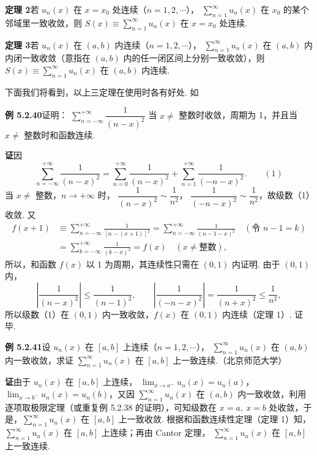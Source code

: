 \documentclass[UTF8,12pt,a4paper,fontset=fandol]{ctexart}
\begin{document}
\noindent\textbf{定理 2}\quad 若 $u_n(x)$ 在 $x=x_0$ 处连续（$n=1,2,\cdots$），
$\displaystyle\sum_{n=1}^{\infty}u_n(x)$ 在 $x_0$ 的某个邻域里一致收敛，则
$S(x)\equiv\displaystyle\sum_{n=1}^{\infty}u_n(x)$ 在 $x=x_0$ 处连续.

\noindent\textbf{定理 3}\quad 若 $u_n(x)$ 在 $(a,b)$ 内连续（$n=1,2,\cdots$），
$\displaystyle\sum_{n=1}^{\infty}u_n(x)$ 在 $(a,b)$ 内内闭一致收敛（意指在
$(a,b)$ 内的任一闭区间上分别一致收敛），则
$S(x)\equiv\displaystyle\sum_{n=1}^{\infty}u_n(x)$ 在 $(a,b)$ 内连续.

下面我们将看到，以上三定理在使用时各有好处. 如

\noindent\textbf{例 5.2.40}\quad 证明：
$\displaystyle\sum_{n=-\infty}^{+\infty}\dfrac1{(n-x)^2}$ 当 $x\ne$ 整数时收敛，周期为
1，并且当 $x\ne$ 整数时和函数连续.

\noindent\textbf{证}\quad 因
\[
  \sum_{n=-\infty}^{+\infty}\frac1{(n-x)^2}
  =\sum_{n=0}^{+\infty}\frac1{(n-x)^2}
  +\sum_{n=1}^{+\infty}\frac1{(-n-x)^2}.
\qquad(1)
\]
当 $x\ne$ 整数，$n\to+\infty$ 时，
$\dfrac1{(n-x)^2}\sim\dfrac1{n^2}$，
$\dfrac1{(-n-x)^2}\sim\dfrac1{n^2}$，故级数（1）收敛. 又
\[
\begin{aligned}
  f(x+1)
  &\equiv \sum_{n=-\infty}^{+\infty}\frac1{[n-(x+1)]^2}
  =\sum_{n=-\infty}^{+\infty}\frac1{(n-1-x)^2}\quad(\text{令 }n-1=k)\\
  &=\sum_{k=-\infty}^{+\infty}\frac1{(k-x)^2}=f(x)\quad(x\ne\text{整数}),
\end{aligned}
\]
所以，和函数 $f(x)$ 以 1 为周期，其连续性只需在 $(0,1)$ 内证明. 由于 $(0,1)$ 内，
\[
  \left|\frac1{(n-x)^2}\right|\le\frac1{(n-1)^2},\qquad
  \left|\frac1{(-n-x)^2}\right|=\frac1{(n+x)^2}\le\frac1{n^2},
\]
所以级数（1）在 $(0,1)$ 内一致收敛，$f(x)$ 在 $(0,1)$ 内连续（定理 1）. 证毕.

\noindent\textbf{例 5.2.41}\quad 设 $u_n(x)$ 在 $[a,b]$ 上连续（$n=1,2,\cdots$），
$\displaystyle\sum_{n=1}^{\infty}u_n(x)$ 在 $(a,b)$ 内一致收敛，求证
$\displaystyle\sum_{n=1}^{\infty}u_n(x)$ 在 $[a,b]$ 上一致连续.（北京师范大学）

\noindent\textbf{证}\quad 由于 $u_n(x)$ 在 $[a,b]$ 上连续，
$\displaystyle\lim_{x\to a^+}u_n(x)=u_n(a)$，
$\displaystyle\lim_{x\to b^-}u_n(x)=u_n(b)$，又因
$\displaystyle\sum_{n=1}^{\infty}u_n(x)$ 在 $(a,b)$ 内一致收敛，利用逐项取极限定理（或重复例 5.2.38 的证明），可知级数在
$x=a,\ x=b$ 处收敛，于是，$\displaystyle\sum_{n=1}^{\infty}u_n(x)$ 在
$[a,b]$ 上一致收敛. 根据和函数连续性定理（定理 1）知，
$\displaystyle\sum_{n=1}^{\infty}u_n(x)$ 在 $[a,b]$ 上连续；再由 Cantor 定理，
$\displaystyle\sum_{n=1}^{\infty}u_n(x)$ 在 $[a,b]$ 上一致连续.
\end{document}
